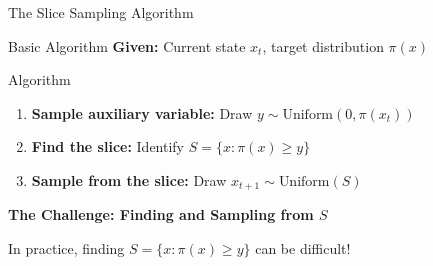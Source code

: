 \documentclass[aspectratio=169]{beamer}
\begin{document}
\begin{frame}{The Slice Sampling Algorithm}
	\begin{block}{Basic Algorithm}
		\textbf{Given:} Current state $x_t$, target distribution $\pi(x)$
	\end{block}
	\begin{block}{Algorithm}
		\begin{enumerate}
			\item \textbf{Sample auxiliary variable:} Draw $y \sim \text{Uniform}(0, \pi(x_t))$
			\item  \textbf{Find the slice:} Identify $S = \{x : \pi(x) \geq y\}$
			\item  \textbf{Sample from the slice:} Draw $x_{t+1} \sim \text{Uniform}(S)$
		\end{enumerate}
	\end{block}

	\vspace{0.3cm}
	\textbf{The Challenge: Finding and Sampling from $S$}

	In practice, finding $S = \{x : \pi(x) \geq y\}$ can be difficult!

\end{frame}
\end{document}
